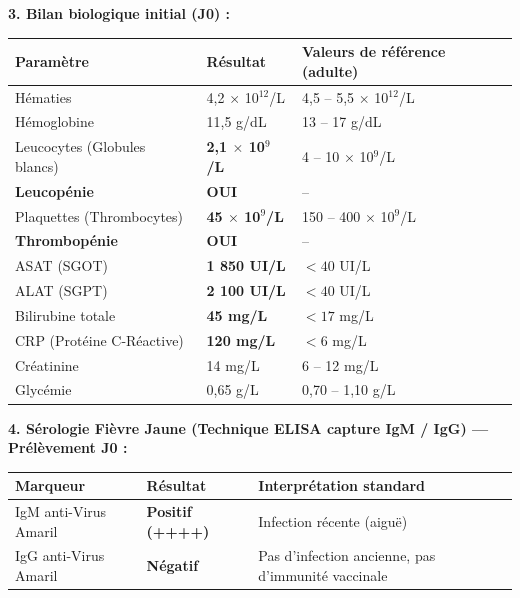 \documentclass[11pt]{article}
\begin{document}
\begin{experience}
\textbf{3. Bilan biologique initial (J0) :}
\begin{center}
\begin{tabularx}{\linewidth}{|l|X|X|}\hline
\textbf{Paramètre} & \textbf{Résultat} & \textbf{Valeurs de référence (adulte)} \\ \hline
Hématies & 4,2 $\times$ 10$^{12}$/L & 4,5 -- 5,5 $\times$ 10$^{12}$/L \\ \hline
Hémoglobine & 11,5 g/dL & 13 -- 17 g/dL \\ \hline
Leucocytes (Globules blancs) & \textbf{2,1 $\times$ 10$^9$/L} & 4 -- 10 $\times$ 10$^9$/L \\ \hline
\rowcolor{poporangeL} \textbf{Leucopénie} & \textbf{OUI} & -- \\ \hline
Plaquettes (Thrombocytes) & \textbf{45 $\times$ 10$^9$/L} & 150 -- 400 $\times$ 10$^9$/L \\ \hline
\rowcolor{poporangeL} \textbf{Thrombopénie} & \textbf{OUI} & -- \\ \hline
ASAT (SGOT) & \textbf{1 850 UI/L} & $< 40$ UI/L \\ \hline
ALAT (SGPT) & \textbf{2 100 UI/L} & $< 40$ UI/L \\ \hline
Bilirubine totale & \textbf{45 mg/L} & $< 17$ mg/L \\ \hline
CRP (Protéine C-Réactive) & \textbf{120 mg/L} & $< 6$ mg/L \\ \hline
Créatinine & 14 mg/L & 6 -- 12 mg/L \\ \hline
Glycémie & 0,65 g/L & 0,70 -- 1,10 g/L \\ \hline
\end{tabularx}
\end{center}

\textbf{4. Sérologie Fièvre Jaune (Technique ELISA capture IgM / IgG) — Prélèvement J0 :}
\begin{center}
\begin{tabularx}{\linewidth}{|l|X|X|}\hline
\textbf{Marqueur} & \textbf{Résultat} & \textbf{Interprétation standard} \\ \hline
IgM anti-Virus Amaril & \textbf{Positif (++++)} & Infection récente (aiguë) \\ \hline
IgG anti-Virus Amaril & \textbf{Négatif} & Pas d'infection ancienne, pas d'immunité vaccinale \\ \hline
\end{tabularx}
\end{center}


\end{experience}
\end{document}

